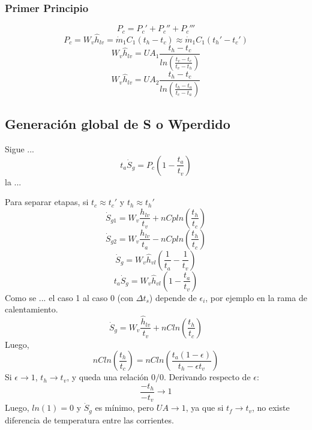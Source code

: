 \documentclass{article}
\begin{document}
\subsubsection{Primer Principio}
\begin{equation}
    P_c=P_c'+P_c''+P_c'''
\end{equation}
\begin{equation}
    P_c=W_v\hat{h}_{lv}=\dot{m}_1C_1\left(t_h-t_c\right)\approx\dot{m}_1C_1\left(t_h'-t_c'\right)
\end{equation}
\begin{equation}
    W_v\hat{h}_{lv}=UA_1\frac{t_h-t_c}{ln\left(\frac{t_v-t_c}{t_v-t_h}\right)}
\end{equation}
\begin{equation}
    W_v\hat{h}_{lv}=UA_2\frac{t_h-t_c}{ln\left(\frac{t_h-t_a}{t_c-t_a}\right)}
\end{equation}
\subsection{Generación global de S o Wperdido}
Sigue ...
\begin{equation}
    t_a\dot{S}_g=P_c\left(1-\frac{t_a}{t_v}\right)
\end{equation}
la ...

Para separar etapas, si $t_c\approx t_c'$ y $t_h\approx t_h'$
\begin{equation}
    \dot{S}_{g1}=W_v\frac{h_{lv}}{t_v}+nCpln\left(\frac{t_h}{t_c}\right)
\end{equation}
\begin{equation}
    \dot{S}_{g2}=W_v\frac{h_{lv}}{t_a}-nCpln\left(\frac{t_h}{t_c}\right)
\end{equation}
\begin{equation}
    \dot{S}_g=W_v\hat{h}_{vl}\left(\frac{1}{t_a}-\frac{1}{t_v}\right)
\end{equation}
\begin{equation}
    t_a\dot{S}_g=W_v\hat{h}_{vl}\left(1-\frac{t_a}{t_v}\right)
\end{equation}
Como se ... el caso 1 al caso 0 (con $\Delta{t_s}$) depende de $\epsilon_i$, por ejemplo en la rama de calentamiento.
\begin{equation}
    \dot{S}_g=W_v\frac{\hat{h}_{lv}}{t_v}+nCln\left(\frac{t_h}{t_c}\right)
\end{equation}
Luego,
\begin{equation}
    nCln\left(\frac{t_h}{t_c}\right)=nCln\left(\frac{t_a\left(1-\epsilon\right)}{t_h-\epsilon t_v}\right)
\end{equation}
Si $\epsilon\xrightarrow{}1$, $t_h\xrightarrow{}t_v$, y queda una relación $0/0$. Derivando respecto de $\epsilon$:
\begin{equation}
    \frac{-t_h}{-t_v}\xrightarrow{}1
\end{equation}
Luego, $ln(1)=0$ y $\dot{S}_g$ es mínimo, pero $UA\xrightarrow{}1$, ya que si $t_f\xrightarrow{}t_v$, no existe diferencia de temperatura entre las corrientes.
\end{document}
